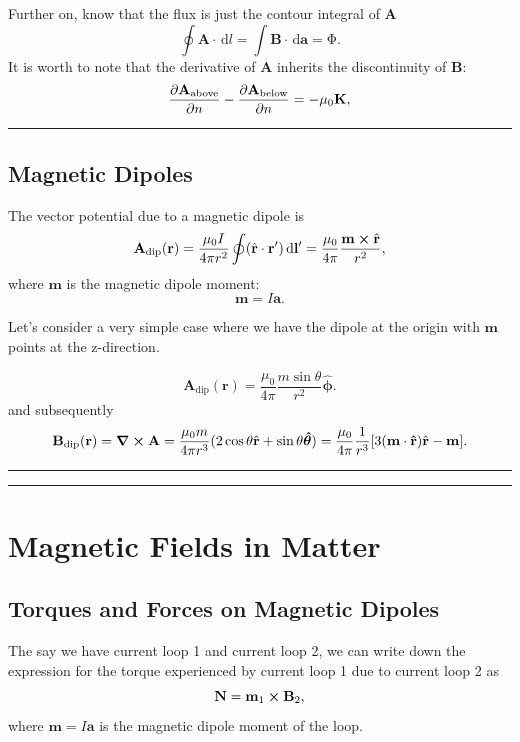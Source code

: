 \documentclass[12pt,english]{article}
\newcommand{\dmr}[1]{\, \mathrm{d}#1} %
\numberwithin{equation}{subsection}
\let\oldhat\hat
\renewcommand{\vec}[1]{\mathbf{#1}}
\renewcommand{\hat}[1]{\oldhat{\mathbf{#1}}}
\begin{document}
Further on, know that the flux is just the contour integral of $\vec{A}$
\begin{equation}
    \oint \vec{A} \cdot \dmr{l} = \int \vec{B} \cdot \dmr{\vec{a}} = \mathrm{\Phi}. 
\end{equation}
It is worth to note that the derivative of $\vec{A}$ inherits the discontinuity of $\vec{B}$:
\begin{equation}
    \pdv{\vec{A}_{\text{above}}}{n} -\pdv{\vec{A}_{\text{below}}}{n} = -\mu_0 \vec{K},
\end{equation}


\par\noindent\rule{\textwidth}{0.4pt}
\subsection{Magnetic Dipoles}
The vector potential due to a magnetic dipole is 
\begin{equation}
    \vec{A}_{\text{dip}}(\vec{r}) = \frac{\mu_0 I}{4 \pi r^2} \oint (\hat{r}\cdot\vec{r'})\dmr{\vec{l'}}=\frac{\mu_0}{4\pi}\frac{\vec{m}\cross \hat{r}}{r^2},
\end{equation}
where $\vec{m}$ is the magnetic dipole moment:
\begin{equation}
    \vec{m} = I \vec{a}. 
\end{equation}

Let's consider a very simple case where we have the dipole at the origin with $\vec{m}$ points at the z-direction. 

\begin{equation}
    \vec{A}_{\text{dip}}(\vec{r}) = \frac{\mu_0}{4 \pi} \frac{m \sin \theta}{r^2} \boldsymbol{\hat{\phi}}.\label{573}
\end{equation}
and subsequently
\begin{equation}
    \vec{B}_{\text{dip}}(\vec{r}) = \curl \vec{A} = \frac{\mu_0 m}{4 \pi r^3}(2\cos\theta \hat{r} + \sin \theta \boldsymbol{\hat{\theta}}) = \frac{\mu_0}{4\pi} \frac{1}{r^3}[3(\vec{m\cdot \hat{r}})\hat{r} - \vec{m}].
\end{equation}
\par\noindent\rule{\textwidth}{0.4pt}
\par\noindent\rule{\textwidth}{0.4pt}

\section{Magnetic Fields in Matter}
\subsection{Torques and Forces on Magnetic Dipoles}
The say we have current loop 1 and current loop 2, we can write down the expression for the torque experienced by current loop 1 due to current loop 2 as 
\begin{equation}
    \vec{N} = \vec{m}_1 \cross \vec{B}_2,
\end{equation}
where $\vec{m} = I\vec{a}$ is the magnetic dipole moment of the loop.
\end{document}
